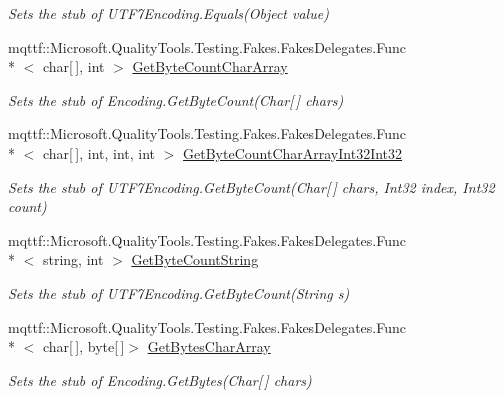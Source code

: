 \begin{DoxyCompactItemize}
\begin{DoxyCompactList}\small\item\em Sets the stub of U\-T\-F7\-Encoding.\-Equals(\-Object value)\end{DoxyCompactList}\item 
mqttf\-::\-Microsoft.\-Quality\-Tools.\-Testing.\-Fakes.\-Fakes\-Delegates.\-Func\\*
$<$ char\mbox{[}$\,$\mbox{]}, int $>$ \hyperlink{class_system_1_1_text_1_1_fakes_1_1_stub_u_t_f7_encoding_a2b176c0cfc572f76203d327eec1547ef}{Get\-Byte\-Count\-Char\-Array}
\begin{DoxyCompactList}\small\item\em Sets the stub of Encoding.\-Get\-Byte\-Count(\-Char\mbox{[}$\,$\mbox{]} chars)\end{DoxyCompactList}\item 
mqttf\-::\-Microsoft.\-Quality\-Tools.\-Testing.\-Fakes.\-Fakes\-Delegates.\-Func\\*
$<$ char\mbox{[}$\,$\mbox{]}, int, int, int $>$ \hyperlink{class_system_1_1_text_1_1_fakes_1_1_stub_u_t_f7_encoding_a6145c580143722373fd009277bc8b16a}{Get\-Byte\-Count\-Char\-Array\-Int32\-Int32}
\begin{DoxyCompactList}\small\item\em Sets the stub of U\-T\-F7\-Encoding.\-Get\-Byte\-Count(\-Char\mbox{[}$\,$\mbox{]} chars, Int32 index, Int32 count)\end{DoxyCompactList}\item 
mqttf\-::\-Microsoft.\-Quality\-Tools.\-Testing.\-Fakes.\-Fakes\-Delegates.\-Func\\*
$<$ string, int $>$ \hyperlink{class_system_1_1_text_1_1_fakes_1_1_stub_u_t_f7_encoding_a3b2e9d4acf3894283cd3ed348f789799}{Get\-Byte\-Count\-String}
\begin{DoxyCompactList}\small\item\em Sets the stub of U\-T\-F7\-Encoding.\-Get\-Byte\-Count(\-String s)\end{DoxyCompactList}\item 
mqttf\-::\-Microsoft.\-Quality\-Tools.\-Testing.\-Fakes.\-Fakes\-Delegates.\-Func\\*
$<$ char\mbox{[}$\,$\mbox{]}, byte\mbox{[}$\,$\mbox{]}$>$ \hyperlink{class_system_1_1_text_1_1_fakes_1_1_stub_u_t_f7_encoding_a095171488646123fc66e3c721ea0a384}{Get\-Bytes\-Char\-Array}
\begin{DoxyCompactList}\small\item\em Sets the stub of Encoding.\-Get\-Bytes(\-Char\mbox{[}$\,$\mbox{]} chars)\end{DoxyCompactList}\item 

\end{DoxyCompactItemize}
